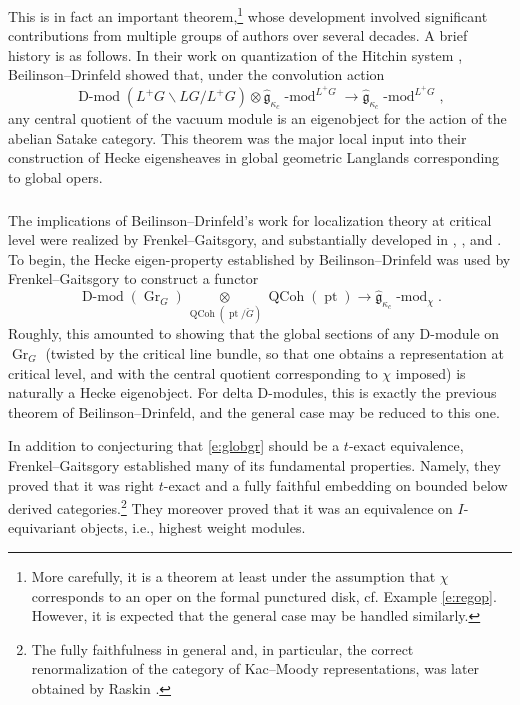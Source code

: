 \documentclass[10pt]{amsart}
\newcommand{\pt}{\on{pt}}
\newcommand{\fgc}{\widehat{\fg}_{\kappa_c}}
\newcommand{\fg}{\mathfrak{g}}
\newcommand{\on}{\operatorname}
\renewcommand{\mod}{\on{-mod}}
\newcommand{\Dmod}{\on{D-mod}}
\theoremstyle{remark}
\newcommand{\Gr}{\operatorname{Gr}}
\numberwithin{equation}{section}
\newcommand{\cG}{\check{G}}
\renewcommand{\mod}{\operatorname{-mod}}
\newcommand{\QCoh}{\on{QCoh}}
\begin{document}
	This is in fact an important theorem,\footnote{More carefully, it is a 
	theorem at least under the assumption 
	that $\chi$ corresponds to an oper on the formal punctured disk, cf. 
	Example \ref{e:regop}. However, it is 
	expected that the general case may be handled similarly.} whose development 
	involved significant contributions from multiple groups of authors over 
	several decades. A brief history is as 
	follows. In their 
	work on quantization of the Hitchin system \cite{bdh}, Beilinson--Drinfeld showed 
	that, under the convolution action 
	\[
	     \Dmod(L^+G \backslash LG / L^+G) \otimes \fgc\mod^{L^+G} \rightarrow 
	     \fgc\mod^{L^+G},
	\] 
	any central quotient of the vacuum module is an eigenobject for the action 
	of the abelian Satake category. This theorem 
	was the major local input into their construction of Hecke eigensheaves in  global geometric Langlands 
	corresponding to global opers. 
	
	\subsubsection{} The implications of Beilinson--Drinfeld's work for localization theory at critical level were realized by Frenkel--Gaitsgory, and substantially developed in \cite{frenkelgaitsgorylocgrassmannian04}, \cite{fg06loc}, and \cite{fgloc09}. To begin, the Hecke eigen-property established by Beilinson--Drinfeld  was used by Frenkel--Gaitsgory to construct a 
	functor
	\begin{equation} \label{e:globgr}
	      \Dmod(\Gr_G)\underset {\QCoh(\pt / \cG)} \otimes \QCoh(\pt) 
	      \rightarrow 
	      \fgc\mod_\chi.
	\end{equation}
	Roughly, this amounted to showing that the global sections of any D-module on 
	$\Gr_G$ (twisted by the critical line bundle, so that one obtains a 
	representation at critical level, and with the central quotient corresponding to $\chi$ imposed) is naturally a Hecke eigenobject. For 
	delta D-modules, this is exactly the previous theorem of 
	Beilinson--Drinfeld, and the general case may be reduced to this one. 
	
	 In addition to conjecturing that \eqref{e:globgr} should be a $t$-exact equivalence, Frenkel--Gaitsgory established many of its fundamental properties. Namely, they 
	proved that it was right $t$-exact and a fully faithful embedding on bounded 
	below derived categories.\footnote{The fully faithfulness in general and, 
	in particular, the correct renormalization of the category of Kac--Moody 
	representations, was later obtained by Raskin \cite{RaskinLocCrit}.} They moreover proved  
	that it was 
	an 
	equivalence on $I$-equivariant objects, i.e., highest 
	weight modules. 
	
\end{document}
